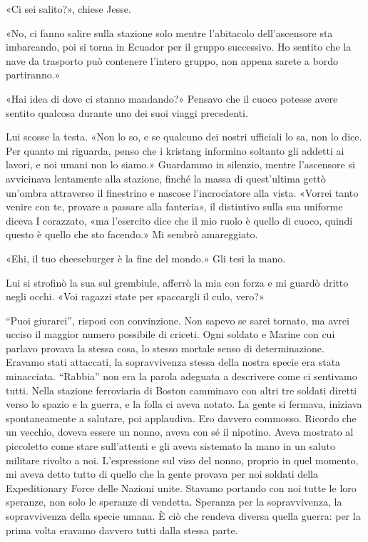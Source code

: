 «Ci sei salito?», chiese Jesse.

«No, ci fanno salire sulla stazione solo mentre l'abitacolo
dell'ascensore sta imbarcando, poi si torna in Ecuador per il gruppo
successivo. Ho sentito che la nave da trasporto può contenere l'intero
gruppo, non appena sarete a bordo partiranno.»

«Hai idea di dove ci stanno mandando?» Pensavo che il cuoco potesse
avere sentito qualcosa durante uno dei suoi viaggi precedenti.

Lui scosse la testa. «Non lo so, e se qualcuno dei nostri ufficiali lo
sa, non lo dice. Per quanto mi riguarda, penso che i kristang informino
soltanto gli addetti ai lavori, e noi umani non lo siamo.» Guardammo in
silenzio, mentre l'ascensore si avvicinava lentamente alla stazione,
finché la massa di quest'ultima gettò un'ombra attraverso il finestrino
e nascose l'incrociatore alla vista. «Vorrei tanto venire con te,
provare a passare alla fanteria», il distintivo sulla sua uniforme
diceva I corazzato, «ma l'esercito dice che il mio ruolo è quello di
cuoco, quindi questo è quello che sto facendo.» Mi sembrò amareggiato.

«Ehi, il tuo cheeseburger è la fine del mondo.» Gli tesi la mano.

Lui si strofinò la sua sul grembiule, afferrò la mia con forza e mi
guardò dritto negli occhi. «Voi ragazzi state per spaccargli il culo,
vero?»

``Puoi giurarci'', risposi con convinzione. Non sapevo se sarei tornato,
ma avrei ucciso il maggior numero possibile di criceti. Ogni soldato e
Marine con cui parlavo provava la stessa cosa, lo stesso mortale senso
di determinazione. Eravamo stati attaccati, la sopravvivenza stessa
della nostra specie era stata minacciata. ``Rabbia'' non era la parola
adeguata a descrivere come ci sentivamo tutti. Nella stazione
ferroviaria di Boston camminavo con altri tre soldati diretti verso lo
spazio e la guerra, e la folla ci aveva notato. La gente si fermava,
iniziava spontaneamente a salutare, poi applaudiva. Ero davvero
commosso. Ricordo che un vecchio, doveva essere un nonno, aveva con sé
il nipotino. Aveva mostrato al piccoletto come stare sull'attenti e gli
aveva sistemato la mano in un saluto militare rivolto a noi.
L'espressione sul viso del nonno, proprio in quel momento, mi aveva
detto tutto di quello che la gente provava per noi soldati della
Expeditionary Force delle Nazioni unite. Stavamo portando con noi tutte
le loro speranze, non solo le speranze di vendetta. Speranza per la
sopravvivenza, la sopravvivenza della specie umana. È ciò che rendeva
diversa quella guerra: per la prima volta eravamo davvero tutti dalla
stessa parte.

